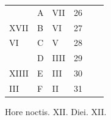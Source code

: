 \begin{center}
\begin{tabular}{l | l | l | r | l l}
\color{Red}  & \color{Red} A & \color{Red} VII & 26 & & \color{Red} \\
\color{Red} XVII & B & \color{Red} VI & 27 & & \color{Red} \\
\color{Red} VI & C & \color{Red} V & 28 & & \color{Red} \\
\color{Red}  & D & \color{Red} IIII & 29 & \color{Red} \\
\color{Red} XIIII & E & \color{Red} III & 30 & & \color{Red} \\
\color{Red} III & F & \color{Red} II & 31 & & \color{Red} \\
\end{tabular}
\newline \color{Red} Hore noctis. XII. Diei. XII.
\end{center}


\newpage
\color{Red}\color{black}

